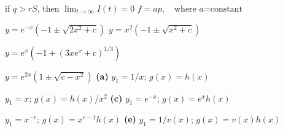 \quad \quad if $q>rS$, then
$\lim_{t\to\infty}I(t)=0$
$f=ap, \quad \mbox{where $a$=constant}$

 $y=e^{-x}\left(-1\pm\sqrt{2x^{2}+c}\right)$
 $y=x^{2}\left(-1\pm\sqrt{x^{2}+c}\right)$

 $y=e^{x}\left(-1+(3xe^{x}+c)^{1/3}\right)$

  $y=e^{2x}(1\pm\sqrt{c-x^{2}})$
{\bf (a)} $y_{1}=1/x$;  \quad $g(x)=h(x)$

\quad {} $y_{1}=x$;  \quad $g(x)=h(x)/x^{2}$
\;  {\bf (c)} $y_{1}=e^{-x}$;   $g(x)=e^{x}h(x)$

\quad {} $y_{1}=x^{-r}$;\;   $g(x)=x^{r-1}h(x)$
\;    {\bf (e)}\;    $y_{1}=1/v(x)$;\;   $g(x)=v(x)h(x)$

